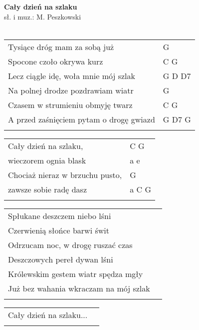 \documentclass[a5paper]{article}
\begin{document}


\noindent
\fontsize{12pt}{15pt}\selectfont
\textbf{Cały dzień na szlaku} \\
\fontsize{8pt}{10pt}\selectfont
sł. i muz.: M. Peszkowski \\ \\
\fontsize{10pt}{12pt}\selectfont
{}
\begin{tabular}{@{}p{9cm}p{3cm}@{}}
\noindent
Tysiące dróg mam za sobą już & G \\
Spocone czoło okrywa kurz & C G \\
Lecz ciągle idę, woła mnie mój szlak & G D D7 \\
Na polnej drodze pozdrawiam wiatr & G \\
Czasem w strumieniu obmyję twarz & C G \\
A przed zaśnięciem pytam o drogę gwiazd & G D7 G \\ \\
\end{tabular}

\noindent
\begin{tabular}{@{}p{8cm}p{3cm}@{}}
Cały dzień na szlaku, & C G \\
wieczorem ognia blask & a e \\
Chociaż nieraz w brzuchu pusto, & G \\
zawsze sobie radę dasz & a C G \\ \\
\end{tabular}

\noindent
\begin{tabular}{@{}p{8.5cm}p{3cm}@{}}
Spłukane deszczem niebo lśni \\
Czerwienią słońce barwi świt \\
Odrzucam noc, w drogę ruszać czas \\
Deszczowych pereł dywan lśni \\
Królewskim gestem wiatr spędza mgły \\
Już bez wahania wkraczam na mój szlak \\ \\
\end{tabular}

\noindent
\begin{tabular}{@{}p{8.5cm}p{3cm}@{}}
Cały dzień na szlaku... \\ \\
\end{tabular}
\end{document}
